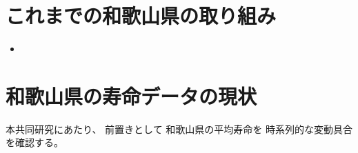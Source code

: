 %






%



%
%
%









\chapter{これまでの和歌山県の取り組み}



\begin{itemize}
\item {}
\end{itemize}






\chapter{和歌山県の寿命データの現状}


本共同研究にあたり、
前置きとして
和歌山県の平均寿命を
時系列的な変動具合を確認する。


